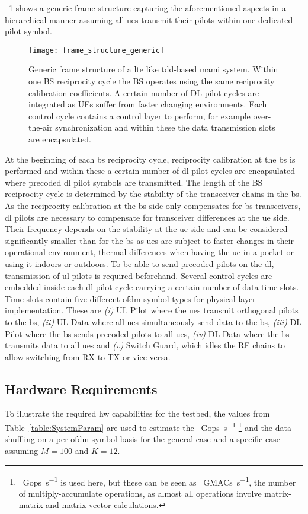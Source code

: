 \documentclass[journal]{IEEEtran}
\begin{document}
\figurename~\ref{fig:frame_structure_generic} shows a generic frame structure capturing the aforementioned aspects in a hierarchical manner assuming all \glspl{ue} transmit their pilots within one dedicated pilot symbol.
\begin{figure}[!t]
	\centering
	\texttt{[image: frame\_structure\_generic]}
	\caption{Generic frame structure of a \gls{lte} like \gls{tdd}-based \gls{mami} system. Within one BS reciprocity cycle the BS operates using the same reciprocity calibration coefficients. A certain number of DL pilot cycles are integrated as UEs suffer from faster changing environments. Each control cycle contains a control layer to perform, for example over-the-air synchronization and within these the data transmission slots are encapsulated.}
	\label{fig:frame_structure_generic}
\end{figure}
At the beginning of each \gls{bs} reciprocity cycle, reciprocity calibration at the \gls{bs} is performed and within these a certain number of \gls{dl} pilot cycles are encapsulated where precoded \gls{dl} pilot symbols are transmitted.
The length of the BS reciprocity cycle is determined by the stability of the transceiver chains in the \gls{bs}.
As the reciprocity calibration at the \gls{bs} side only compensates for \gls{bs} transceivers, \gls{dl} pilots are necessary to compensate for transceiver differences at the \gls{ue} side.
Their frequency depends on the stability at the \gls{ue} side and can be considered significantly smaller than for the \gls{bs} as \glspl{ue} are subject to faster changes in their operational environment, \eg thermal differences when having the \gls{ue} in a pocket or using it indoors or outdoors.
To be able to send precoded pilots on the \gls{dl}, transmission of \gls{ul} pilots is required beforehand.
Several control cycles are embedded inside each \gls{dl} pilot cycle carrying a certain number of data time slots.
Time slots contain five different \gls{ofdm} symbol types for physical layer implementation.
These are \emph{(i)} UL Pilot where the \glspl{ue} transmit orthogonal pilots to the \gls{bs}, \emph{(ii)} UL Data where all \glspl{ue} simultaneously send data to the \gls{bs}, \emph{(iii)} DL Pilot where the \gls{bs} sends precoded pilots to all \glspl{ue}, \emph{(iv)} DL Data where the \gls{bs} transmits data to all \glspl{ue} and \emph{(v)} Switch Guard, which idles the RF chains to allow switching from RX to TX or vice versa.
%
%
%

\subsection{Hardware Requirements}
%
To illustrate the required \gls{hw} capabilities for the testbed, the values from Table~\ref{table:SystemParam} are used to estimate the \SI{}{Gops\per\second}
\footnote{\SI{}{Gops\per\second} is used here, but these can be seen as \SI{}{GMACs\per\second}, \ie the number of multiply-accumulate operations, as almost all operations involve matrix-matrix and matrix-vector calculations.} 
and the data shuffling on a per \gls{ofdm} symbol basis for the general case and a specific case assuming $M=100$ and $K=12$.
\end{document}
